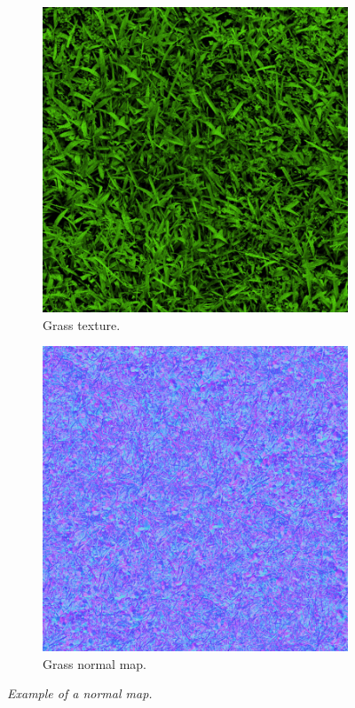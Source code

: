 \begin{figure}[H]
\begin{subfigure}{.5\textwidth}
  \centering
  \includegraphics[width=0.9\linewidth]{images/grass1.jpg}
  \caption{Grass texture.}
  \label{fig:normalMapExampleGrassTexture}
\end{subfigure}%
\begin{subfigure}{.5\textwidth}
  \centering
  \includegraphics[width=0.9\linewidth]{images/grass1NormalMap.jpg}
  \caption{Grass normal map.}
  \label{fig:normalMapExampleGrassNormalmap}
\end{subfigure}
\caption[Normal Map example]{\textit{Example of a normal map.}}
\label{fig:normalMapExample}
\end{figure}